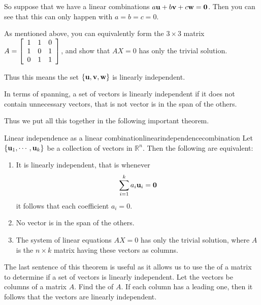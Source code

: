 \begin{solution}
So suppose that we have a linear combinations $a{\bf u} + b {\bf v}
+ c{\bf w} = {\bf 0}$. Then you can see that this can only happen
with $a=b=c=0$.

As mentioned above, you can equivalently form the $3 \times 3$ matrix $A = 
\left[ 
\begin{array}{ccc}
1  & 1 & 0 \\
1  & 0 & 1 \\
0  & 1 & 1 \\
\end{array}
\right]$, and show that $AX=0$ has only the trivial solution.

Thus this  means the set $\left\{ {\bf u}, {\bf v}, {\bf w} \right\}$ is linearly independent. 
\end{solution}

In terms of spanning, a set of vectors is linearly independent if it
does not contain unnecessary vectors, that is not vector is in the span of the others.

Thus we put all this together in the following important theorem.

\begin{theorem}{Linear independence as a linear combination}{linearindependencecombination}
Let $\left\{{\bf u}_{1},\cdots ,{\bf u}_{k}\right\}$ be a collection of vectors  in
$\mathbb{R}^{n}$. Then the following are equivalent:

\begin{enumerate}
\item It is linearly independent, that is whenever
\begin{equation*}
\sum_{i=1}^{k}a_{i}{\bf u}_{i}={\bf 0}
\end{equation*}
it follows that each coefficient $a_{i}=0$.
\item No vector is in the span of the others.
\item The system of
linear equations $AX=0$ has only the trivial solution, where $A$ is
the $n \times k$ matrix having these vectors as columns. 
\end{enumerate}
\end{theorem}

The last sentence of this theorem is useful as it allows us to use the
{\rref} of a matrix to determine if a set of vectors is linearly
independent. Let the vectors be columns of a matrix $A$. Find the
{\rref} of $A$. If each column has a leading one, then it follows
that the vectors are linearly independent.

